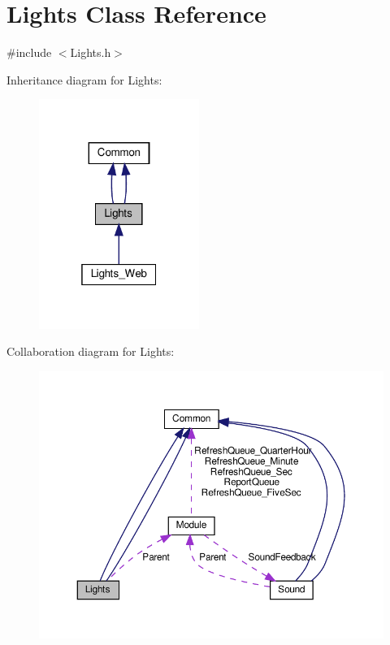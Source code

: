 \hypertarget{class_lights}{}\section{Lights Class Reference}
\label{class_lights}


{\ttfamily \#include $<$Lights.\+h$>$}



Inheritance diagram for Lights\+:
\nopagebreak
\begin{figure}[H]
\begin{center}
\leavevmode
\includegraphics[width=148pt]{class_lights__inherit__graph}
\end{center}
\end{figure}


Collaboration diagram for Lights\+:
\nopagebreak
\begin{figure}[H]
\begin{center}
\leavevmode
\includegraphics[width=350pt]{class_lights__coll__graph}
\end{center}
\end{figure}
